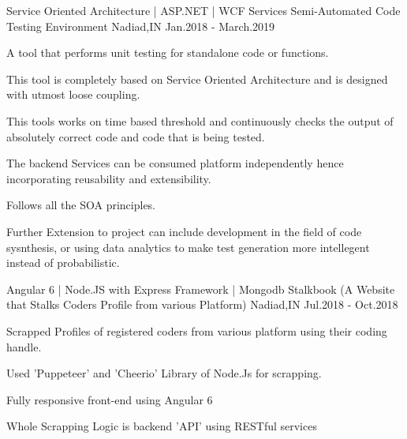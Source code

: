 


\begin{cventries}


\cventry
{Service Oriented Architecture | ASP.NET | WCF Services} %
{Semi-Automated Code Testing Environment} %
{Nadiad,IN} %
{Jan.2018 - March.2019} %
{ %
\begin{cvitems}
\item {A tool that performs unit testing for standalone code or functions.}
\item {This tool is completely based on Service Oriented Architecture and is designed with utmost loose coupling.}
\item {This tools works on time based threshold and continuously checks the output of absolutely correct code and code that is being tested.}
\item {The backend Services can be consumed platform independently hence incorporating reusability and extensibility.}
\item {Follows all the SOA principles.}
\item {Further Extension to project can include development in the field of code sysnthesis, or using data analytics to make test generation more intellegent instead of probabilistic.}
\end{cvitems}
}


\cventry
{Angular 6 | Node.JS with Express Framework | Mongodb} %
{Stalkbook (A Website that Stalks Coders Profile from various Platform)} %
{Nadiad,IN} %
{Jul.2018 - Oct.2018} %
{ %
\begin{cvitems}
\item {Scrapped Profiles of registered coders from various platform using their coding handle.}
\item {Used 'Puppeteer' and 'Cheerio' Library of Node.Js for scrapping.}
\item {Fully responsive front-end using Angular 6}
\item {Whole Scrapping Logic is backend 'API' using RESTful services}
\end{cvitems}
}


\end{cventries}
